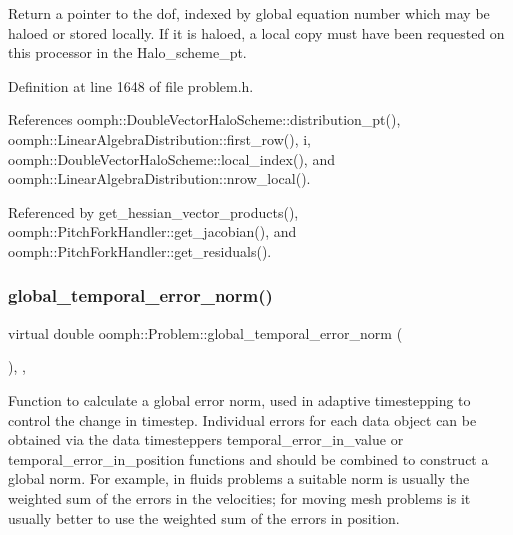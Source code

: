Return a pointer to the dof, indexed by global equation number which may be haloed or stored locally. If it is haloed, a local copy must have been requested on this processor in the Halo\+\_\+scheme\+\_\+pt. 



Definition at line 1648 of file problem.\+h.



References oomph\+::\+Double\+Vector\+Halo\+Scheme\+::distribution\+\_\+pt(), oomph\+::\+Linear\+Algebra\+Distribution\+::first\+\_\+row(), i, oomph\+::\+Double\+Vector\+Halo\+Scheme\+::local\+\_\+index(), and oomph\+::\+Linear\+Algebra\+Distribution\+::nrow\+\_\+local().



Referenced by get\+\_\+hessian\+\_\+vector\+\_\+products(), oomph\+::\+Pitch\+Fork\+Handler\+::get\+\_\+jacobian(), and oomph\+::\+Pitch\+Fork\+Handler\+::get\+\_\+residuals().

\mbox{\label{classoomph_1_1Problem_ac7667864b71a3889c95c29307422ac8e}} 
\subsubsection{\texorpdfstring{global\+\_\+temporal\+\_\+error\+\_\+norm()}{global\_temporal\_error\_norm()}}
{\footnotesize\ttfamily virtual double oomph\+::\+Problem\+::global\+\_\+temporal\+\_\+error\+\_\+norm (\begin{DoxyParamCaption}{ }\end{DoxyParamCaption})\hspace{0.3cm}{\ttfamily [inline]}, {\ttfamily [protected]}, {\ttfamily [virtual]}}



Function to calculate a global error norm, used in adaptive timestepping to control the change in timestep. Individual errors for each data object can be obtained via the data timestepper\textquotesingle{}s temporal\+\_\+error\+\_\+in\+\_\+value or temporal\+\_\+error\+\_\+in\+\_\+position functions and should be combined to construct a global norm. For example, in fluids problems a suitable norm is usually the weighted sum of the errors in the velocities; for moving mesh problems is it usually better to use the weighted sum of the errors in position. 



